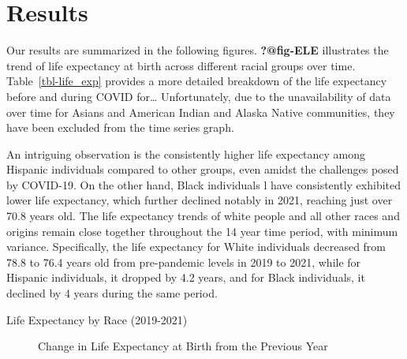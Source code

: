 \documentclass[
  letterpaper,
  DIV=11,
  numbers=noendperiod]{scrartcl}
\begin{document}
\section{Results}\label{results}

Our results are summarized in the following figures. \textbf{?@fig-ELE}
illustrates the trend of life expectancy at birth across different
racial groups over time. Table~\ref{tbl-life_exp} provides a more
detailed breakdown of the life expectancy before and during COVID
for\ldots{} Unfortunately, due to the unavailability of data over time
for Asians and American Indian and Alaska Native communities, they have
been excluded from the time series graph.

An intriguing observation is the consistently higher life expectancy
among Hispanic individuals compared to other groups, even amidst the
challenges posed by COVID-19. On the other hand, Black individuals l
have consistently exhibited lower life expectancy, which further
declined notably in 2021, reaching just over 70.8 years old. The life
expectancy trends of white people and all other races and origins remain
close together throughout the 14 year time period, with minimum
variance. Specifically, the life expectancy for White individuals
decreased from 78.8 to 76.4 years old from pre-pandemic levels in 2019
to 2021, while for Hispanic individuals, it dropped by 4.2 years, and
for Black individuals, it declined by 4 years during the same period.

\begin{table}

\caption{\label{tbl-life\_exp}Life Expectancy by Race (2019-2021)}

\centering{

}

\end{table}%

\begin{figure}


\caption{\label{fig-CLE}Change in Life Expectancy at Birth from the
Previous Year}

\end{figure}%
\end{document}
